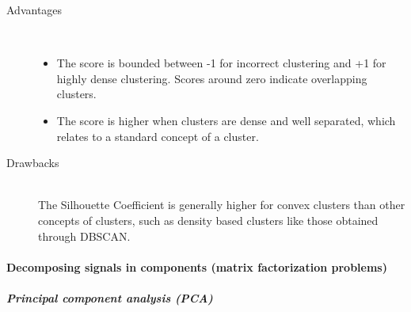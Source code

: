 \begin{description}
	\item[Advantages] \hfill \\
	\begin{itemize}
		\item The score is bounded between -1 for incorrect
		clustering and +1 for highly dense clustering. Scores around
		 zero indicate overlapping clusters.
		\item The score is higher when clusters are dense and well
		 separated, which relates to a standard concept of a cluster.
	\end{itemize}
	\item[Drawbacks] \hfill \\
	The Silhouette Coefficient is generally higher for convex clusters
	than other concepts of clusters, such as density based clusters like
	 those obtained through DBSCAN.
\end{description}

\paragraph{Decomposing signals in components (matrix factorization problems)}
\label{paragraph:Decomposing}
\subparagraph{Principal component analysis (PCA)}
\label{subparagraph:PCA}


